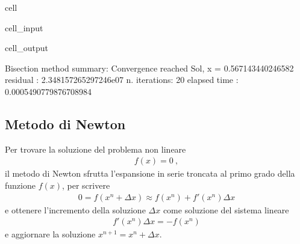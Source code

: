 \documentclass[letterpaper,10pt,italian]{jupyterBook}
\begin{document}
\begin{sphinxuseclass}{cell}
\begin{sphinxVerbatimInput}
\begin{sphinxuseclass}{cell_input}
\end{sphinxuseclass}\end{sphinxVerbatimInput}
\begin{sphinxVerbatimOutput}

\begin{sphinxuseclass}{cell_output}
\begin{sphinxVerbatim}[commandchars=\\\{\}]
Bisection method summary: 
Convergence reached
Sol, x = \PYGZhy{}0.567143440246582
residual     : \PYGZhy{}2.348157265297246e\PYGZhy{}07
n. iterations: 20
elapsed time : 0.0005490779876708984
\end{sphinxVerbatim}

\end{sphinxuseclass}\end{sphinxVerbatimOutput}

\end{sphinxuseclass}

\subsection{Metodo di Newton}
\label{\detokenize{ch/numerics/nonlinear:metodo-di-newton}}
\sphinxAtStartPar
Per trovare la soluzione del problema non lineare
\begin{equation*}
\begin{split}f(x) = 0 \ ,\end{split}
\end{equation*}
\sphinxAtStartPar
il metodo di Newton sfrutta l’espansione in serie troncata al primo grado della funzione \(f(x)\), per scrivere
\begin{equation*}
\begin{split}0 = f(x^n + \Delta x) \approx f(x^n) + f'(x^n) \Delta x \end{split}
\end{equation*}
\sphinxAtStartPar
e ottenere l’incremento della soluzione \(\Delta x\) come soluzione del sistema lineare
\begin{equation*}
\begin{split}f'(x^n) \Delta x = -f(x^n)\end{split}
\end{equation*}
\sphinxAtStartPar
e aggiornare la soluzione \(x^{n+1} = x^{n} + \Delta x\).
\end{document}

